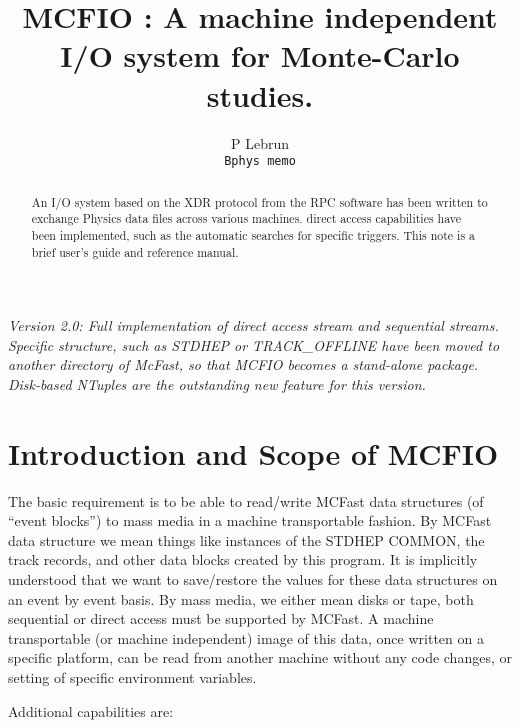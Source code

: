 
\pagestyle{plain}
\title{ MCFIO : A machine independent I/O system for Monte-Carlo studies.}  
\author{P Lebrun \\
{\tt Bphys memo}}


\maketitle
 \begin{abstract}
An I/O system based on the XDR protocol from the RPC software has been 
written to exchange Physics data files across various machines. 
direct access capabilities have been implemented, such as the 
automatic searches for specific triggers.  This note is a brief 
user's guide and reference manual.   
\end{abstract}

\vspace{.1in} 
{\em Version 2.0: Full implementation of direct access stream and 
sequential streams. Specific structure, such as STDHEP or TRACK\_OFFLINE
have been moved to another directory of McFast, so that MCFIO becomes 
a stand-alone package. Disk-based NTuples are the outstanding new feature
for this version.} 



\section{Introduction and Scope of MCFIO}

The basic requirement is to be able to read/write MCFast data
structures (of ``event blocks'')  to mass media in a machine transportable 
fashion. By MCFast data structure we mean things like instances of the STDHEP 
COMMON, the track records, and other data blocks created by this program. 
It is implicitly understood that we want to save/restore the values for these 
data structures on an event by event basis. By mass media, we either mean disks or 
tape, both sequential or direct access must be supported by MCFast.
A machine transportable (or machine independent) image of this data,
once written on a specific platform, can be read from another machine 
without any code changes, or setting of specific environment variables.
 
Additional capabilities are:
 	
